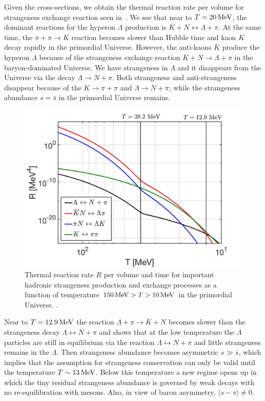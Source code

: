 Given the cross-sections, we obtain the thermal reaction rate per volume for strangeness exchange reaction seen in~. We see that near to $T=20\text{\,MeV}$, the dominant reactions for the hyperon $\Lambda$ production is $\overline{K}+N\leftrightarrow\Lambda+\pi$. At the same time, the $\pi+\pi\to K$ reaction becomes slower than Hubble time and kaon $K$ decay rapidly in the primordial Universe. However, the anti-kaons $\overline K$ produce the hyperon $\Lambda$ because of the strangeness exchange reaction $\overline{K}+N\rightarrow\Lambda+\pi$ in the baryon-dominated Universe. We have strangeness in $\Lambda$ and it disappears from the Universe via the decay $\Lambda\rightarrow N+\pi$. Both strangeness and anti-strangeness disappear because of the $K\rightarrow\pi+\pi$ and $\Lambda\rightarrow N+\pi$, while the strangeness abundance $s = \bar{s}$ in the primordial Universe remains.

\begin{figure} 
\centerline{\includegraphics[width=0.7\linewidth]{./plots/NewHyperonRate_C.jpg}}
\caption{Thermal reaction rate $R$ per volume and time for important hadronic strangeness production and exchange processes as a function of temperature $150\text{\,MeV}> T>10\text{\,MeV}$ in the primordial Universe. . }
\label{Lambda_Rate_volume.fig} 
\end{figure}

Near to $T=12.9\text{\,MeV}$ the reaction $\Lambda+\pi\rightarrow\overline{K}+N$ becomes slower than the strangeness decay $\Lambda\leftrightarrow N+\pi$ and shows that at the low temperature the $\Lambda$ particles are still in equilibrium via the reaction $\Lambda\leftrightarrow N+\pi$ and little strangeness remains in the $\Lambda$. Then strangeness abundance becomes asymmetric $s\gg \bar{s}$, which implies that the assumption for strangeness conservation can only be valid until the temperature $T\sim13\text{\,MeV}$. Below this temperature a new regime opens up in which the tiny residual strangeness abundance is governed by weak decays with no re-equilibration with mesons. Also, in view of baron asymmetry, $\langle s-\bar s\rangle \ne 0$.

